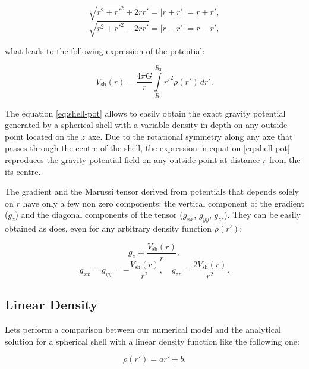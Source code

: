 \documentclass[extra]{gji}
\begin{document}
\begin{equation}
    \sqrt{r^2 + r'^2 + 2rr'} = |r + r'| = r + r',
\end{equation}
\begin{equation}
    \sqrt{r^2 + r'^2 - 2rr'} = |r - r'| = r - r',
\end{equation}

\noindent what leads to the following expression of the potential:

\begin{equation}
    V_\text{sh}(r) = \frac{4\pi G}{r}
    \int\limits_{R_1}^{R_2} {r'}^2 \rho(r') \, dr'.
\label{eq:shell-pot}
\end{equation}

The equation \ref{eq:shell-pot} allows to easily obtain the exact 
gravity potential generated by a spherical shell with a variable 
density in depth on any outside point located on the $z$ axe.
Due to the rotational symmetry along any axe that passes through the 
centre of the shell, the expression in equation \ref{eq:shell-pot} 
reproduces the gravity potential field on any outside point at distance 
$r$ from the its centre.

The gradient and the Marussi tensor derived from potentials that 
depends solely on $r$ have only a few non zero components: the vertical 
component of the gradient ($g_z$) and the diagonal components of the 
tensor ($g_{xx}$, $g_{yy}$, $g_{zz}$).
They can be easily obtained as \citet{Grombein2013} does, even for any 
arbitrary density function $\rho(r')$:

\begin{equation}
    g_z = \frac{V_\text{sh}(r)}{r},
\end{equation}
\begin{equation}
    g_{xx} = g_{yy} = -\frac{V_\text{sh}(r)}{r^2}, \quad
    g_{zz} = \frac{2V_\text{sh}(r)}{r^2}.
\end{equation}


\subsection{Linear Density}

Lets perform a comparison between our numerical model and the 
analytical solution for a spherical shell with a linear density 
function like the following one:

\begin{equation}
    \rho(r') = ar' + b.
\end{equation}
\end{document}
